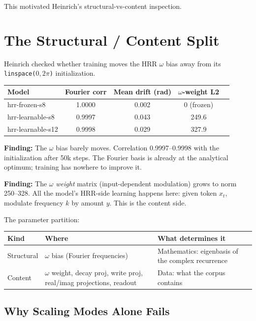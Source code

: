 \documentclass[11pt,a4paper]{report}
\newcommand{\finding}[1]{\textcolor{finding}{\textbf{Finding:}} #1}
\begin{document}
This motivated Heinrich's structural-vs-content inspection.


\chapter{The Structural / Content Split}

Heinrich checked whether training moves the HRR $\omega$ bias away from its \texttt{linspace($0, 2\pi$)} initialization.

\begin{center}
\begin{tabular}{lcccc}
\toprule
Model & Fourier corr & Mean drift (rad) & $\omega$-weight L2 \\
\midrule
hrr-frozen-s8 & 1.0000 & 0.002 & 0 (frozen) \\
hrr-learnable-s8 & 0.9997 & 0.043 & 249.6 \\
hrr-learnable-s12 & 0.9998 & 0.029 & 327.9 \\
\bottomrule
\end{tabular}
\end{center}

\finding{The $\omega$ bias barely moves. Correlation 0.9997--0.9998 with the initialization after 50k steps. The Fourier basis is already at the analytical optimum; training has nowhere to improve it.}

\finding{The $\omega$ \textit{weight} matrix (input-dependent modulation) grows to norm 250--328. All the model's HRR-side learning happens here: given token $x_t$, modulate frequency $k$ by amount $y$. This is the content side.}

The parameter partition:
\begin{center}
\begin{tabular}{p{3cm}p{5cm}p{5cm}}
\toprule
Kind & Where & What determines it \\
\midrule
Structural & $\omega$ bias (Fourier frequencies) & Mathematics: eigenbasis of the complex recurrence \\
Content & $\omega$ weight, decay proj, write proj, real/imag projections, readout & Data: what the corpus contains \\
\bottomrule
\end{tabular}
\end{center}

\section{Why Scaling Modes Alone Fails}
\end{document}
